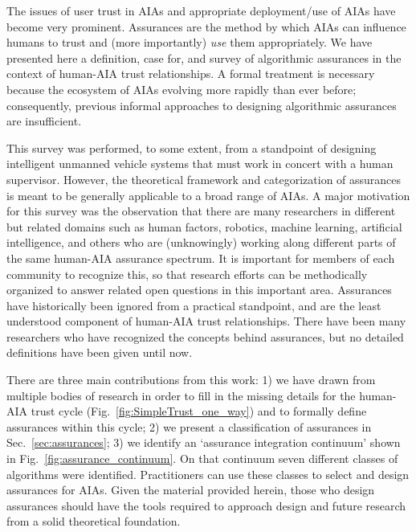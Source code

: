 The issues of user trust in AIAs and appropriate deployment/use of AIAs have become very prominent.  Assurances are the method by which AIAs can influence humans to trust and (more importantly) \emph{use} them appropriately. We have presented here a definition, case for, and survey of algorithmic assurances in the context of human-AIA trust relationships. A formal treatment is necessary because the ecosystem of AIAs evolving more rapidly than ever before; consequently, previous informal approaches to designing algorithmic assurances are insufficient. 

This survey was performed, to some extent, from a standpoint of designing intelligent unmanned vehicle systems that must work in concert with a human supervisor. However, the theoretical framework and categorization of assurances is meant to be generally applicable to a broad range of AIAs. A major motivation for this survey was the observation that there are many researchers in different but related domains such as human factors, robotics, machine learning, artificial intelligence, and others who are (unknowingly) working along different parts of the same human-AIA assurance spectrum. It is important for members of each community to recognize this, so that research efforts can be  methodically organized to answer related open questions in this important area. Assurances have historically been ignored from a practical standpoint, and are the least understood component of human-AIA trust relationships. There have been many researchers who have recognized the concepts behind assurances, but no detailed definitions have been given until now.

There are three main contributions from this work: 1) we have drawn from multiple bodies of research in order to fill in the missing details for the human-AIA trust cycle (Fig.~\ref{fig:SimpleTrust_one_way}) and to formally define assurances within this cycle; 2) we present a classification of assurances in Sec.~\ref{sec:assurances}; 3) we identify an `assurance integration continuum' shown in Fig.~\ref{fig:assurance_continuum}. On that continuum seven different classes of algorithms were identified. Practitioners can use these classes to select and design assurances for AIAs. Given the material provided herein, those who design assurances should have the tools required to approach design and future research from a solid theoretical foundation.

